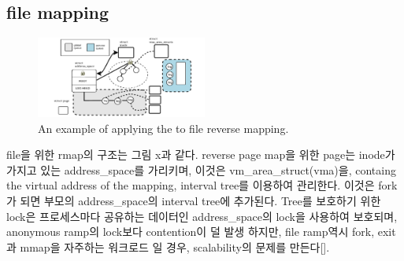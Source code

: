 


\subsection{file mapping}

\begin{figure}[tb]
  \begin{center}
     \includegraphics[width=0.5\textwidth,height=0.5\textheight,keepaspectratio]{fig/file_rmap}
  \end{center}
  \caption{An example of applying the  to file reverse mapping. }
  \label{fig:deferu}
\end{figure}


\ifkor
file을 위한 rmap의 구조는 그림 x과 같다. reverse page map을 위한 page는 inode가 가지고 있는
address\_space를 가리키며, 이것은 vm\_area\_struct(vma)을, containg the virtual address
of the mapping, interval tree를 이용하여 관리한다. 이것은 fork가 되면 부모의 address\_space의
interval tree에 추가된다.
Tree를 보호하기 위한 lock은 프로세스마다 공유하는 데이터인 address\_space의 lock을 사용하여
보호되며, anonymous ramp의 lock보다 contention이 덜 발생 하지만, file ramp역시 fork, exit과
mmap을 자주하는 워크로드 일 경우, scalability의 문제를 만든다[]. 
\else

